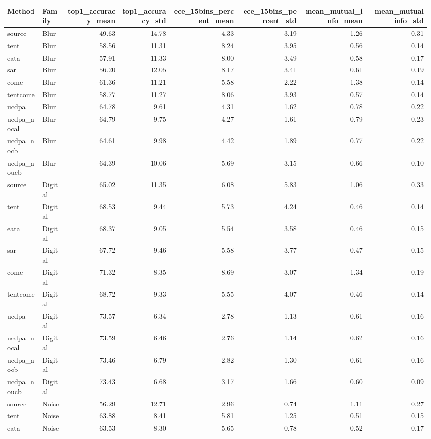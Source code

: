 \begin{tabular}{llrrrrrr}
\toprule
Method & Family & top1_accuracy_mean & top1_accuracy_std & ece_15bins_percent_mean & ece_15bins_percent_std & mean_mutual_info_mean & mean_mutual_info_std \\
\midrule
source & Blur & 49.63 & 14.78 & 4.33 & 3.19 & 1.26 & 0.31 \\
tent & Blur & 58.56 & 11.31 & 8.24 & 3.95 & 0.56 & 0.14 \\
eata & Blur & 57.91 & 11.33 & 8.00 & 3.49 & 0.58 & 0.17 \\
sar & Blur & 56.20 & 12.05 & 8.17 & 3.41 & 0.61 & 0.19 \\
come & Blur & 61.36 & 11.21 & 5.58 & 2.22 & 1.38 & 0.14 \\
tentcome & Blur & 58.77 & 11.27 & 8.06 & 3.93 & 0.57 & 0.14 \\
ucdpa & Blur & 64.78 & 9.61 & 4.31 & 1.62 & 0.78 & 0.22 \\
ucdpa_nocal & Blur & 64.79 & 9.75 & 4.27 & 1.61 & 0.79 & 0.23 \\
ucdpa_nocb & Blur & 64.61 & 9.98 & 4.42 & 1.89 & 0.77 & 0.22 \\
ucdpa_noucb & Blur & 64.39 & 10.06 & 5.69 & 3.15 & 0.66 & 0.10 \\
source & Digital & 65.02 & 11.35 & 6.08 & 5.83 & 1.06 & 0.33 \\
tent & Digital & 68.53 & 9.44 & 5.73 & 4.24 & 0.46 & 0.14 \\
eata & Digital & 68.37 & 9.05 & 5.54 & 3.58 & 0.46 & 0.15 \\
sar & Digital & 67.72 & 9.46 & 5.58 & 3.77 & 0.47 & 0.15 \\
come & Digital & 71.32 & 8.35 & 8.69 & 3.07 & 1.34 & 0.19 \\
tentcome & Digital & 68.72 & 9.33 & 5.55 & 4.07 & 0.46 & 0.14 \\
ucdpa & Digital & 73.57 & 6.34 & 2.78 & 1.13 & 0.61 & 0.16 \\
ucdpa_nocal & Digital & 73.59 & 6.46 & 2.76 & 1.14 & 0.62 & 0.16 \\
ucdpa_nocb & Digital & 73.46 & 6.79 & 2.82 & 1.30 & 0.61 & 0.16 \\
ucdpa_noucb & Digital & 73.43 & 6.68 & 3.17 & 1.66 & 0.60 & 0.09 \\
source & Noise & 56.29 & 12.71 & 2.96 & 0.74 & 1.11 & 0.27 \\
tent & Noise & 63.88 & 8.41 & 5.81 & 1.25 & 0.51 & 0.15 \\
eata & Noise & 63.53 & 8.30 & 5.65 & 0.78 & 0.52 & 0.17 \\

\end{tabular}
